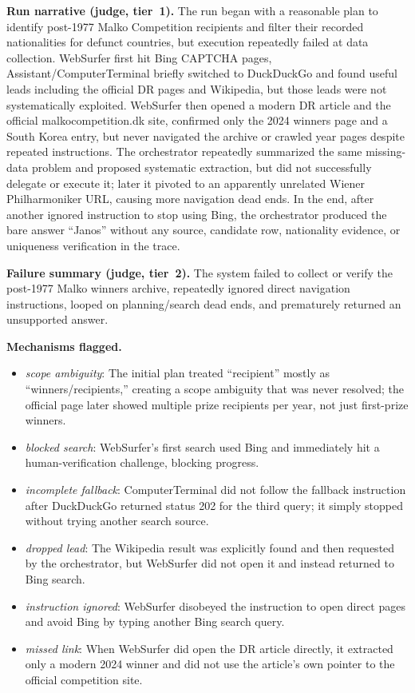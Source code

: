 \textbf{Run narrative (judge, tier~1).} The run began with a reasonable plan to identify post-1977 Malko Competition recipients and filter their recorded nationalities for defunct countries, but execution repeatedly failed at data collection. WebSurfer first hit Bing CAPTCHA pages, Assistant/ComputerTerminal briefly switched to DuckDuckGo and found useful leads including the official DR pages and Wikipedia, but those leads were not systematically exploited. WebSurfer then opened a modern DR article and the official malkocompetition.dk site, confirmed only the 2024 winners page and a South Korea entry, but never navigated the archive or crawled year pages despite repeated instructions. The orchestrator repeatedly summarized the same missing-data problem and proposed systematic extraction, but did not successfully delegate or execute it; later it pivoted to an apparently unrelated Wiener Philharmoniker URL, causing more navigation dead ends. In the end, after another ignored instruction to stop using Bing, the orchestrator produced the bare answer ``Janos'' without any source, candidate row, nationality evidence, or uniqueness verification in the trace.

\textbf{Failure summary (judge, tier~2).} The system failed to collect or verify the post-1977 Malko winners archive, repeatedly ignored direct navigation instructions, looped on planning/search dead ends, and prematurely returned an unsupported answer.

\textbf{Mechanisms flagged.}
\begin{itemize}
  \item \emph{scope ambiguity}: The initial plan treated ``recipient'' mostly as ``winners/recipients,'' creating a scope ambiguity that was never resolved; the official page later showed multiple prize recipients per year, not just first-prize winners.
  \item \emph{blocked search}: WebSurfer's first search used Bing and immediately hit a human-verification challenge, blocking progress.
  \item \emph{incomplete fallback}: ComputerTerminal did not follow the fallback instruction after DuckDuckGo returned status 202 for the third query; it simply stopped without trying another search source.
  \item \emph{dropped lead}: The Wikipedia result was explicitly found and then requested by the orchestrator, but WebSurfer did not open it and instead returned to Bing search.
  \item \emph{instruction ignored}: WebSurfer disobeyed the instruction to open direct pages and avoid Bing by typing another Bing search query.
  \item \emph{missed link}: When WebSurfer did open the DR article directly, it extracted only a modern 2024 winner and did not use the article's own pointer to the official competition site.
\end{itemize}

